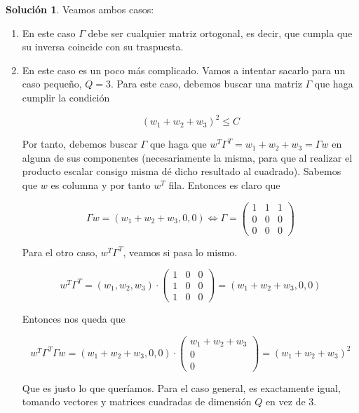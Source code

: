 \documentclass[a4paper, 11pt]{article}
\theoremstyle{definition}
\newtheorem*{solucion}{Solución}
\begin{document}
  \begin{solucion}
    Veamos ambos casos:
    \begin{enumerate}
      \item En este caso $\Gamma$ debe ser cualquier matriz ortogonal, es decir, que cumpla que su inversa coincide con su traspuesta.
      \item En este caso es un poco más complicado. Vamos a intentar sacarlo para un caso pequeño, $Q=3$. Para este caso, debemos buscar una matriz $\Gamma$ que haga cumplir la condición

      $$ (w_1 + w_2 + w_3)^2 \leq C $$

      Por tanto, debemos buscar $\Gamma$ que haga que $w^T \Gamma^T = w_1 + w_2 + w_3 = \Gamma w$ en alguna de sus componentes (necesariamente la misma, para que al realizar el producto escalar consigo misma dé dicho resultado al cuadrado). Sabemos que $w$ es columna y por tanto $w^T$ fila. Entonces es claro que

      \[
      \Gamma w = (w_1 + w_2 + w_3, 0, 0) \Leftrightarrow \Gamma = \begin{pmatrix}
                                                                    1 & 1 & 1 \\
                                                                    0 & 0 & 0 \\
                                                                    0 & 0 & 0
                                                                    \end{pmatrix}
      \]

      Para el otro caso, $w^T \Gamma^T$, veamos si pasa lo mismo.

      \[
      w^T \Gamma^T = (w_1, w_2, w_3) \cdot  \begin{pmatrix}
                                            1 & 0 & 0 \\
                                            1 & 0 & 0 \\
                                            1 & 0 & 0
                                            \end{pmatrix}  = (w_1 + w_2 + w_3, 0, 0)
      \]

      Entonces nos queda que

      \[
        w^T \Gamma^T \Gamma w = (w_1 + w_2 + w_3, 0, 0) \cdot \begin{pmatrix}
                                  w_1 + w_2 + w_3 \\
                                  0  \\
                                  0
                                  \end{pmatrix} = (w_1 + w_2 + w_3)^2
      \]

      Que es justo lo que queríamos. Para el caso general, es exactamente igual, tomando vectores y matrices cuadradas de dimensión $Q$ en vez de $3$.

    \end{enumerate}
  \end{solucion}
\end{document}
